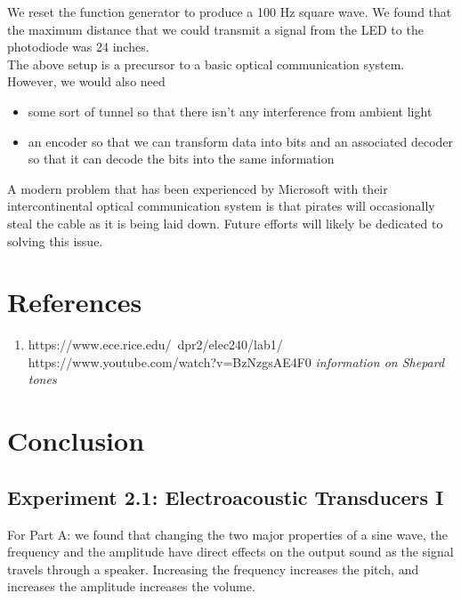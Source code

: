 \documentclass[10pt]{article}
\begin{document}
We reset the function generator to produce a 100 Hz square wave. We found that the maximum distance that we could transmit a signal from the LED to the photodiode was 24 inches. \\
The above setup is a precursor to a basic optical communication system. However, we would also need 
\begin{itemize}
	\item some sort of tunnel so that there isn't any interference from ambient light
	\item an encoder so that we can transform data into bits and an associated decoder so that it can decode the bits into the same information
\end{itemize}
A modern problem that has been experienced by Microsoft with their intercontinental optical communication system is that pirates will occasionally steal the cable as it is being laid down. Future efforts will likely be dedicated to solving this issue. 
\medskip


\section{References}

	\begin{enumerate}
		\item https://www.ece.rice.edu/~dpr2/elec240/lab1/
		https://www.youtube.com/watch?v=BzNzgsAE4F0 \textit{information on Shepard tones}
	\end{enumerate}
\medskip


\section{Conclusion}
\subsection{Experiment 2.1: Electroacoustic Transducers I}
\qquad For Part A: we found that changing the two major properties of a sine wave, the frequency and the amplitude have direct effects on the output sound as the signal travels through a speaker. Increasing the frequency increases the pitch, and increases the amplitude increases the volume.
\end{document}
